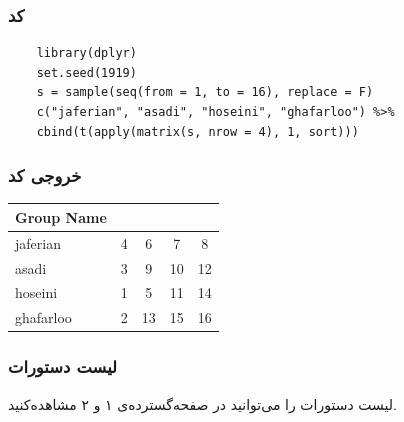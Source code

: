 \subsubsection*{کد}
\begin{latin}
	\begin{lstlisting}
	library(dplyr)
	set.seed(1919)
	s = sample(seq(from = 1, to = 16), replace = F)  
	c("jaferian", "asadi", "hoseini", "ghafarloo") %>% 
	cbind(t(apply(matrix(s, nrow = 4), 1, sort)))
	\end{lstlisting}
\end{latin}
\subsubsection*{خروجی کد}
\begin{latin}
	\centering
	\begin{tabular}{l|cccc}
		Group Name & & & & \\
		\hline \hline
		jaferian & 4 & 6 & 7 & 8\\
		
		asadi & 3 & 9 & 10 & 12\\
		hoseini & 1 & 5 & 11 & 14\\
		ghafarloo & 2 & 13 & 15 & 16\\
	\end{tabular}
\end{latin}
\subsubsection*{لیست دستورات}
لیست دستورات را می‌توانید در صفحه‌گسترده‌ی ۱ و ۲ مشاهده‌کنید.
